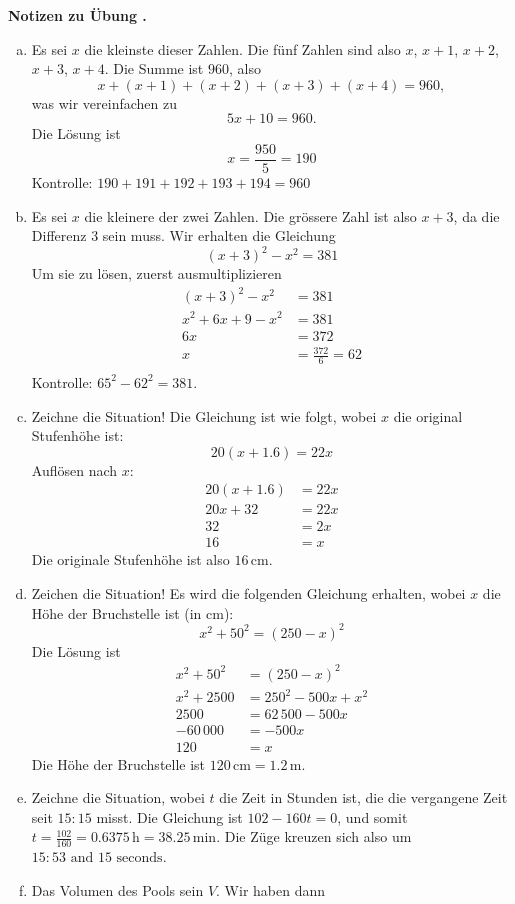 \documentclass[%
11pt,%
twoside,%
titlepage,%
swissgerman,%
headsepline%
]{scrartcl}
\newcommand{\faReturnGray}{\textcolor{gray}{\faMailReply}} %
\theoremstyle{definition}
\theoremstyle{plain}
\newcommand{\concatueb}[1]{ueb:#1}%
\newcommand{\concatlsg}[1]{lsg:#1}%
\newcounter{uebcounter}[section]
\renewcommand{\theuebcounter}{\thesection.\arabic{uebcounter}}  %
\newenvironment{lsg}[1]{%
	\par\noindent\textbf{Notizen zu Übung \theuebcounter\label{\concatlsg{#1}}}
	\hfill\hyperref[\concatueb{#1}]{\faReturnGray}\par %
}{%
	\par%
}
\begin{document}
	\begin{lsg}{saetzchenaufgaben}
		\begin{enumerate}[a)]
			\item Es sei $x$ die kleinste dieser Zahlen. Die fünf Zahlen sind also $x$, $x+1$, $x+2$, $x+3$, $x+4$. Die Summe ist $960$, also
			$$x+(x+1)+(x+2)+(x+3)+(x+4)=960,$$
			was wir vereinfachen zu $${5x+10=960}.$$
			Die Lösung ist $$x=\frac{950}{5}={190}$$ Kontrolle: $190+191+192+193+194=960$
			\item Es sei $x$ die kleinere der zwei Zahlen. Die grössere Zahl ist also $x+3$, da die Differenz $3$ sein muss. Wir erhalten die Gleichung $${(x+3)^2-x^2=381}$$ Um sie zu lösen, zuerst ausmultiplizieren
			\begin{align*}
				(x+3)^2-x^2 & =381 \\
				{x^2}+6x+9 -{x^2} & = 381\tag{$-9$}\\
				6x & = 372\tag{$\div6$}\\
				x & =\frac{372}{6}={62}\\ 
			\end{align*}
			Kontrolle: $65^2-62^2=381$.
			\item Zeichne die Situation!
			Die Gleichung ist wie folgt, wobei $x$ die original Stufenhöhe ist: $${20  (x+1.6) = 22x}$$ Auflösen nach $x$:
			\begin{align*}
				20  (x+1.6) & = 22x \\
				20x+32 & = 22x\tag{$-20x$}\\
				32 & = 2x\tag{$\div2$}\\
				{16} & =x 
			\end{align*}
			Die originale Stufenhöhe ist also $16\,\text{cm}$.
			\item Zeichen die Situation!
			Es wird die folgenden Gleichung erhalten, wobei $x$ die Höhe der Bruchstelle ist (in cm): $${x^2+50^2 = (250-x)^2}$$ Die Lösung ist
			\begin{align*}
				x^2+50^2 & = (250-x)^2 \\
				x^2+2500 & = 250^2-500x+x^2\tag{$-x^2$}\\
				2500 & = 62\,500-500x\tag{$-62\,500$}\\
				-60\,000 & = -500x\tag{$\div(-500)$}\\
					{120} & =x 
				\end{align*}
				Die Höhe der Bruchstelle ist $120\,\text{cm}=1.2\,\text{m}$.
				\item Zeichne die Situation, wobei $t$ die Zeit in Stunden ist, die die vergangene Zeit seit $15:15$ misst.
				Die Gleichung ist ${102-160 t = 0}$, und somit $t=\frac{102}{160}=0.6375\,\text{h} = 38.25 \,\text{min}$. Die Züge kreuzen sich also um ${15:53 \mbox{ and } 15 \mbox{ seconds}}$.
				\item Das Volumen des Pools sein $V$. Wir haben dann
				

\end{enumerate}
\end{lsg}
\end{document}
